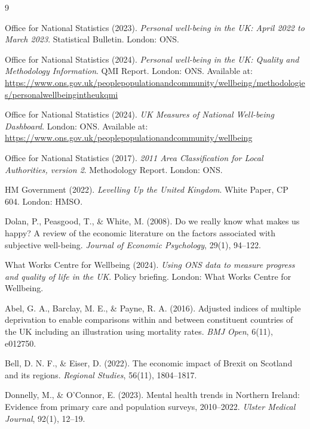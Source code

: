 \documentclass[12pt,a4paper]{article}
\begin{document}

\begin{thebibliography}{9}

Office for National Statistics (2023).
\textit{Personal well-being in the UK: April 2022 to March 2023}.
Statistical Bulletin. London: ONS.

Office for National Statistics (2024).
\textit{Personal well-being in the UK: Quality and Methodology Information}.
QMI Report. London: ONS.
Available at: \url{https://www.ons.gov.uk/peoplepopulationandcommunity/wellbeing/methodologies/personalwellbeingintheukqmi}

Office for National Statistics (2024).
\textit{UK Measures of National Well-being Dashboard}.
London: ONS.
Available at: \url{https://www.ons.gov.uk/peoplepopulationandcommunity/wellbeing}

Office for National Statistics (2017).
\textit{2011 Area Classification for Local Authorities, version 2}.
Methodology Report. London: ONS.

HM Government (2022).
\textit{Levelling Up the United Kingdom}.
White Paper, CP 604. London: HMSO.

Dolan, P., Peasgood, T., \& White, M. (2008).
Do we really know what makes us happy? A review of the economic literature on the factors associated with subjective well-being.
\textit{Journal of Economic Psychology}, 29(1), 94--122.

What Works Centre for Wellbeing (2024).
\textit{Using ONS data to measure progress and quality of life in the UK}.
Policy briefing. London: What Works Centre for Wellbeing.

Abel, G. A., Barclay, M. E., \& Payne, R. A. (2016).
Adjusted indices of multiple deprivation to enable comparisons within and between constituent countries of the UK including an illustration using mortality rates.
\textit{BMJ Open}, 6(11), e012750.

Bell, D. N. F., \& Eiser, D. (2022).
The economic impact of Brexit on Scotland and its regions.
\textit{Regional Studies}, 56(11), 1804--1817.

Donnelly, M., \& O'Connor, E. (2023).
Mental health trends in Northern Ireland: Evidence from primary care and population surveys, 2010--2022.
\textit{Ulster Medical Journal}, 92(1), 12--19.

\end{thebibliography}
\end{document}
